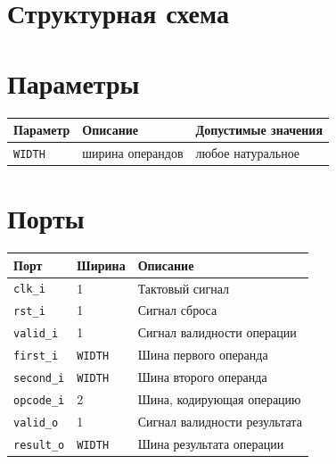 \section{Структурная схема}
\begin{figure}[H]
    \centering
    
\end{figure}

\section{Параметры}

\begin{table}[H]
    \begin{tabular}{|l|l|l|}
        \hline
        \textbf{Параметр}  & \textbf{Описание} & \textbf{Допустимые значения}    \\ \hline
        \texttt{WIDTH}     & ширина операндов  & любое натуральное              \\ \hline
    \end{tabular}
\end{table}

\section{Порты}

\begin{table}[H]
    \begin{tabular}{|l|l|l|}
        \hline
        \textbf{Порт}      & \textbf{Ширина} & \textbf{Описание}                \\ \hline
        \texttt{clk\_i}    & 1               & Тактовый сигнал                  \\ \hline
        \texttt{rst\_i}    & 1               & Сигнал сброса                    \\ \hline
        \texttt{valid\_i}  & 1               & Сигнал валидности операции       \\ \hline
        \texttt{first\_i}  & \texttt{WIDTH}  & Шина первого операнда            \\ \hline
        \texttt{second\_i} & \texttt{WIDTH}  & Шина второго операнда            \\ \hline
        \texttt{opcode\_i} & 2               & Шина, кодирующая операцию        \\ \hline
        \texttt{valid\_o}  & 1               & Сигнал валидности результата     \\ \hline
        \texttt{result\_o} & \texttt{WIDTH}  & Шина результата операции          \\ \hline
    \end{tabular}
\end{table}

